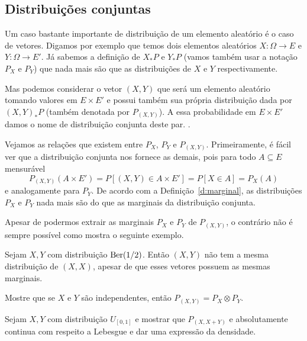 \begin{topics}

\section{Distribuições conjuntas}

Um caso bastante importante de distribuição de um elemento aleatório é o caso de vetores.
Digamos por exemplo que temos dois elementos aleatórios $X:\Omega \to E$ e $Y:\Omega \to E'$.
Já sabemos a definição de $X_*P$ e $Y_*P$ (vamos também usar a notação $P_X$ e $P_Y$) que nada mais são que as distribuições de $X$ e $Y$ respectivamente.

Mas podemos considerar o vetor $(X, Y)$ que será um elemento aleatório tomando valores em $E \times E'$ e possui também sua própria distribuição dada por $(X, Y)_*P$ (também denotada por $P_{(X, Y)}$).
A essa probabilidade em $E \times E'$ damos o nome de distribuição conjunta deste par. .

Vejamos as relações que existem entre $P_X$, $P_Y$ e $P_{(X,Y)}$.
Primeiramente, é fácil ver que a distribuição conjunta nos fornece as demais, pois para todo $A \subseteq E$ mensurável
\begin{equation}
  P_{(X,Y)}(A \times E') = P[(X, Y) \in A \times E'] = P[X \in A] = P_X(A)
\end{equation}
e analogamente para $P_Y$.
De acordo com a Definição~\ref{d:marginal}, as distribuições $P_X$ e $P_Y$ nada mais são do que as marginais da distribuição conjunta.

Apesar de podermos extrair as marginais $P_X$ e $P_Y$ de $P_{(X,Y)}$, o contrário não é sempre possível como mostra o seguinte exemplo.
\begin{example}
  Sejam $X, Y$ \iid com distribuição $\operatorname{Ber}(1/2)$.
  Então $(X, Y)$ não tem a mesma distribuição de $(X, X)$, apesar de que esses vetores possuem as mesmas marginais.
\end{example}

\begin{exercise}
  Mostre que se $X$ e $Y$ são independentes, então $P_{(X,Y)} = P_X \otimes P_Y$.
\end{exercise}

\begin{exercise}
  Sejam $X, Y$ \iid com distribuição $U_{[0,1]}$ e mostrar que  $P_{(X, X + Y)}$ e absolutamente continua com respeito a Lebesgue e dar uma expressão da densidade.
\end{exercise}


\end{topics}
